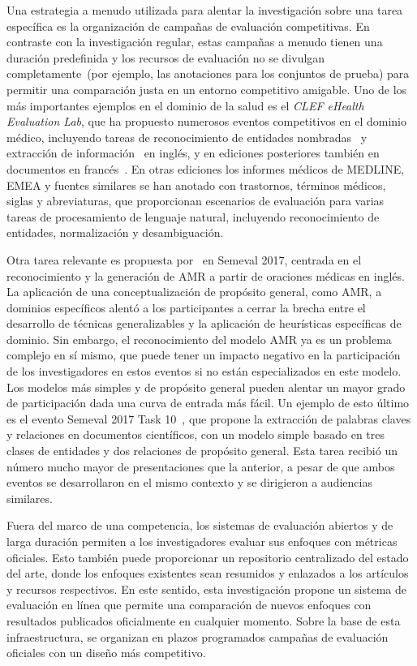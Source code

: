 Una estrategia a menudo utilizada para alentar la investigación sobre una tarea específica es la organización de campañas de evaluación competitivas. En contraste con la investigación regular, estas campañas a menudo tienen una duración predefinida y los recursos de evaluación no se divulgan completamente~(por ejemplo, las anotaciones para los conjuntos de prueba) para permitir una comparación justa en un entorno competitivo amigable. Uno de los más importantes ejemplos en el dominio de la salud es el \textit{CLEF eHealth Evaluation Lab}, que ha propuesto numerosos eventos competitivos en el dominio médico, incluyendo tareas de reconocimiento de entidades nombradas~\cite{clef2013} y extracción de información~\cite{clef2014} en inglés, y en ediciones posteriores también en documentos en francés~\cite{clef2015, clef2016}. 
En otras ediciones los informes médicos de MEDLINE, EMEA y fuentes similares se han anotado con trastornos, términos médicos, siglas y abreviaturas, que proporcionan escenarios de evaluación para varias tareas de procesamiento de lenguaje natural, incluyendo reconocimiento de entidades, normalización y desambiguación.

Otra tarea relevante es propuesta por~\citet{semeval2017-task9} en Semeval 2017, centrada en el reconocimiento y la generación de AMR a partir de oraciones médicas en inglés.
La aplicación de una conceptualización de propósito general, como AMR, a dominios específicos alentó a los participantes a cerrar la brecha entre el desarrollo de técnicas generalizables y la aplicación de heurísticas específicas de dominio.
Sin embargo, el reconocimiento del modelo AMR ya es un problema complejo en sí mismo, que puede tener un impacto negativo en la participación de los investigadores en estos eventos si no están especializados en este modelo.
Los modelos más simples y de propósito general pueden alentar un mayor grado de participación dada una curva de entrada más fácil.
Un ejemplo de esto último es el evento Semeval 2017 Task 10~\cite{semeval2017-task10}, que propone la extracción de palabras claves y relaciones en documentos científicos, con un modelo simple basado en tres clases de entidades y dos relaciones de propósito general.
Esta tarea recibió un número mucho mayor de presentaciones que la anterior, a pesar de que ambos eventos se desarrollaron en el mismo contexto y se dirigieron a audiencias similares.

Fuera del marco de una competencia, los sistemas de evaluación abiertos y de larga duración permiten
a los investigadores evaluar sus enfoques con métricas oficiales. Esto también puede proporcionar un repositorio centralizado del estado del arte, donde los enfoques existentes sean resumidos y enlazados a los artículos y recursos respectivos.
En este sentido, esta investigación propone un sistema de evaluación en línea que permite una comparación de
nuevos enfoques con resultados publicados oficialmente en cualquier momento. Sobre la base de esta infraestructura, se organizan en plazos programados campañas de evaluación oficiales con un diseño más competitivo.

